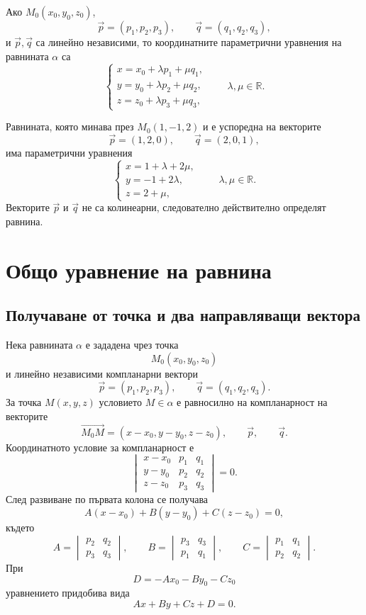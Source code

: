 \begin{keydefn}
Ако $M_0(x_0,y_0,z_0)$,
\[
\vec p=(p_1,p_2,p_3),\qquad
\vec q=(q_1,q_2,q_3),
\]
и $\vec p,\vec q$ са линейно независими, то координатните параметрични уравнения на равнината $\alpha$ са
\[
\boxed{
\begin{cases}
x=x_0+\lambda p_1+\mu q_1,\\
y=y_0+\lambda p_2+\mu q_2,\\
z=z_0+\lambda p_3+\mu q_3,
\end{cases}
\qquad \lambda,\mu\in\mathbb R.}
\]
\end{keydefn}

\begin{example}
Равнината, която минава през $M_0(1,-1,2)$ и е успоредна на векторите
\[
\vec p=(1,2,0),\qquad \vec q=(2,0,1),
\]
има параметрични уравнения
\[
\begin{cases}
x=1+\lambda+2\mu,\\
y=-1+2\lambda,\\
z=2+\mu,
\end{cases}
\qquad \lambda,\mu\in\mathbb R.
\]
Векторите $\vec p$ и $\vec q$ не са колинеарни, следователно действително определят равнина.
\end{example}

\section{Общо уравнение на равнина}\label{s:29.2}

\subsection{Получаване от точка и два направляващи вектора}\label{s:29.2.1}

Нека равнината $\alpha$ е зададена чрез точка
\[
M_0(x_0,y_0,z_0)
\]
и линейно независими компланарни вектори
\[
\vec p=(p_1,p_2,p_3),\qquad
\vec q=(q_1,q_2,q_3).
\]
За точка $M(x,y,z)$ условието $M\in\alpha$ е равносилно на компланарност на векторите
\[
\overrightarrow{M_0M}=(x-x_0,y-y_0,z-z_0),\qquad
\vec p,\qquad \vec q.
\]
Координатното условие за компланарност е
\[
\begin{vmatrix}
x-x_0 & p_1 & q_1\\
y-y_0 & p_2 & q_2\\
z-z_0 & p_3 & q_3
\end{vmatrix}=0.
\]
След развиване по първата колона се получава
\[
A(x-x_0)+B(y-y_0)+C(z-z_0)=0,
\]
където
\[
A=
\begin{vmatrix}
p_2&q_2\\
p_3&q_3
\end{vmatrix},
\qquad
B=
\begin{vmatrix}
p_3&q_3\\
p_1&q_1
\end{vmatrix},
\qquad
C=
\begin{vmatrix}
p_1&q_1\\
p_2&q_2
\end{vmatrix}.
\]
При
\[
D=-Ax_0-By_0-Cz_0
\]
уравнението придобива вида
\[
Ax+By+Cz+D=0.
\]

